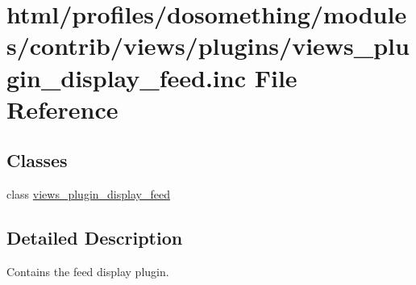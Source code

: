 \hypertarget{views__plugin__display__feed_8inc}{
\section{html/profiles/dosomething/modules/contrib/views/plugins/views\_\-plugin\_\-display\_\-feed.inc File Reference}
\label{views__plugin__display__feed_8inc}
}
\subsection*{Classes}
\begin{DoxyCompactItemize}
\item 
class \hyperlink{classviews__plugin__display__feed}{views\_\-plugin\_\-display\_\-feed}
\end{DoxyCompactItemize}


\subsection{Detailed Description}
Contains the feed display plugin. 
